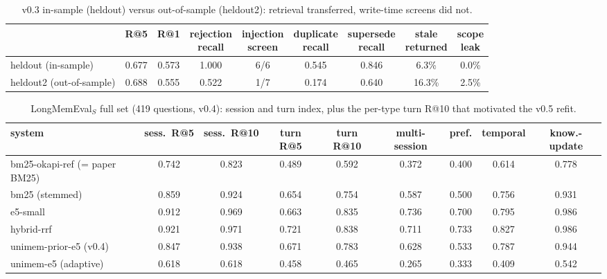 \documentclass[10pt,twocolumn]{article}
\begin{document}
\begin{table}[H]
\centering\small
\caption{v0.3 in-sample (heldout) versus out-of-sample (heldout2): retrieval transferred, write-time screens did not.}
\label{tab:inout}
\begin{tabular}{@{}lcccccccc@{}}
\toprule
& R@5 & R@1 & \makecell{rejection\\recall} & \makecell{injection\\screen} & \makecell{duplicate\\recall} & \makecell{supersede\\recall} & \makecell{stale\\returned} & \makecell{scope\\leak} \\
\midrule
heldout (in-sample) & 0.677 & 0.573 & 1.000 & 6/6 & 0.545 & 0.846 & 6.3\% & 0.0\% \\
heldout2 (out-of-sample) & 0.688 & 0.555 & 0.522 & 1/7 & 0.174 & 0.640 & 16.3\% & 2.5\% \\
\bottomrule
\end{tabular}
\end{table}

\begin{table}[H]
\centering\small
\caption{LongMemEval$_S$ full set (419 questions, v0.4): session and turn index, plus the per-type turn R@10 that motivated
the v0.5 refit.}
\label{tab:lmefull}
\setlength{\tabcolsep}{4pt}
\begin{tabular}{@{}lcccc|cccc@{}}
\toprule
system & sess.\ R@5 & sess.\ R@10 & turn R@5 & turn R@10 & multi-session & pref. & temporal & know.-update \\
\midrule
bm25-okapi-ref (= paper BM25) & 0.742 & 0.823 & 0.489 & 0.592 & 0.372 & 0.400 & 0.614 & 0.778 \\
bm25 (stemmed) & 0.859 & 0.924 & 0.654 & 0.754 & 0.587 & 0.500 & 0.756 & 0.931 \\
e5-small & 0.912 & 0.969 & 0.663 & 0.835 & 0.736 & 0.700 & 0.795 & 0.986 \\
hybrid-rrf & 0.921 & 0.971 & 0.721 & 0.838 & 0.711 & 0.733 & 0.827 & 0.986 \\
unimem-prior-e5 (v0.4) & 0.847 & 0.938 & 0.671 & 0.783 & 0.628 & 0.533 & 0.787 & 0.944 \\
unimem-e5 (adaptive) & 0.618 & 0.618 & 0.458 & 0.465 & 0.265 & 0.333 & 0.409 & 0.542 \\
\bottomrule
\end{tabular}
\end{table}
\end{document}
